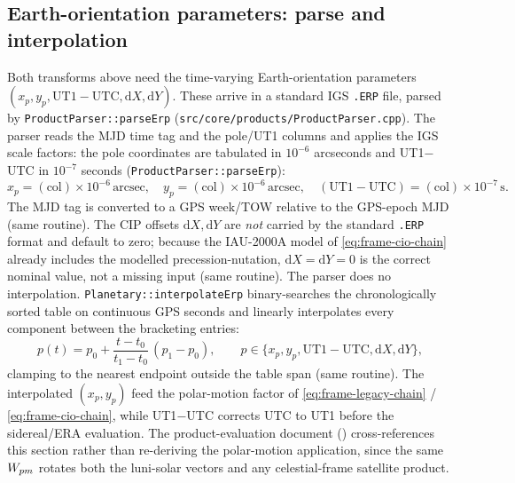 \documentclass[main.tex]{subfiles}
\begin{document}
\subsection{Earth-orientation parameters: parse and interpolation}
\label{sec:frame-erp}

Both transforms above need the time-varying Earth-orientation parameters
$(x_p, y_p, \mathrm{UT1}-\mathrm{UTC}, \mathrm{d}X, \mathrm{d}Y)$.  These
arrive in a standard IGS \texttt{.ERP} file, parsed by
\texttt{ProductParser::parseErp} (\texttt{src/core/products/ProductParser.cpp}).
The parser reads the MJD time tag and the pole/UT1 columns and applies
the IGS scale factors: the pole coordinates are tabulated in
$10^{-6}$ arcseconds and UT1$-$UTC in $10^{-7}$ seconds
(\texttt{ProductParser::parseErp}):
\begin{equation}
x_p = (\text{col})\times 10^{-6}\,\text{arcsec}, \quad
y_p = (\text{col})\times 10^{-6}\,\text{arcsec}, \quad
(\mathrm{UT1}-\mathrm{UTC}) = (\text{col})\times 10^{-7}\,\text{s}.
\label{eq:frame-erp-scale}
\end{equation}
The MJD tag is converted to a GPS week/TOW relative to the GPS-epoch MJD
(same routine).  The CIP offsets $\mathrm{d}X,
\mathrm{d}Y$ are \emph{not} carried by the standard \texttt{.ERP} format
and default to zero; because the IAU-2000A model of
\eqref{eq:frame-cio-chain} already includes the modelled
precession-nutation, $\mathrm{d}X = \mathrm{d}Y = 0$ is the correct
nominal value, not a missing input (same routine).  The parser
does no interpolation.  \texttt{Planetary::interpolateErp}
binary-searches
the chronologically sorted table on continuous GPS seconds and linearly
interpolates every component between the bracketing entries:
\begin{equation}
p(t) = p_{0} + \frac{t - t_{0}}{t_{1}-t_{0}}\,(p_{1}-p_{0}),
\qquad p \in \{x_p, y_p, \mathrm{UT1}{-}\mathrm{UTC}, \mathrm{d}X, \mathrm{d}Y\},
\label{eq:frame-erp-interp}
\end{equation}
clamping to the nearest endpoint outside the table span (same routine).
The interpolated $(x_p, y_p)$ feed
the polar-motion factor of \eqref{eq:frame-legacy-chain} /
\eqref{eq:frame-cio-chain}, while UT1$-$UTC corrects UTC to UT1 before
the sidereal/ERA evaluation.  The product-evaluation document
() cross-references this section
rather than re-deriving the polar-motion application, since the same
$W_{pm}$ rotates both the luni-solar vectors and any celestial-frame
satellite product.
\end{document}
